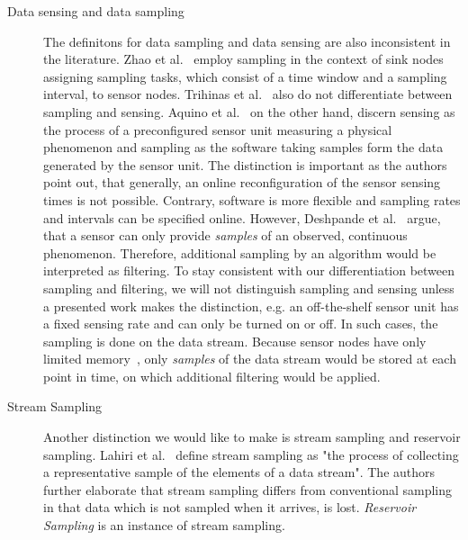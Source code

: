\begin{description}
    \item[Data sensing and data sampling] 
        The definitons for data sampling and data sensing are also inconsistent
        in the literature. Zhao et al.~\cite{zhao2016cats} employ sampling in
        the context of sink nodes assigning sampling tasks, which consist of a
        time window and a sampling interval, to sensor nodes. Trihinas et
        al.~\cite{trihinas2015adam} also do not differentiate between sampling
        and sensing.  Aquino et al.~\cite{aquino2014musa} on the other hand,
        discern sensing as the process of a preconfigured sensor unit measuring
        a physical phenomenon and sampling as the software taking samples form
        the data generated by the sensor unit. The distinction is important as
        the authors point out, that generally, an online reconfiguration of the
        sensor sensing times is not possible. Contrary, software is more
        flexible and sampling rates and intervals can be specified online.
        However, Deshpande et al.~\cite{deshpande2004model} argue, that a
        sensor can only provide \textit{samples} of an observed, continuous
        phenomenon. Therefore, additional sampling by an algorithm would be
        interpreted as filtering. To stay consistent with our differentiation
        between sampling and filtering, we will not distinguish sampling and
        sensing unless a presented work makes the distinction, e.g. an
        off-the-shelf sensor unit has a fixed sensing rate and can only be
        turned on or off. In such cases, the sampling is done on the data
        stream. Because sensor nodes have only limited
        memory~\cite{akyildiz2002wireless}, only \textit{samples} of the data
        stream would be stored at each point in time, on which additional
        filtering would be applied. 

    \item[Stream Sampling]
        Another distinction we would like to make is stream sampling and
        reservoir sampling. Lahiri et al.~\cite{Lahiri2009} define stream
        sampling as "the process of collecting a representative sample of the
        elements of a data stream". The authors further elaborate that stream
        sampling differs from conventional sampling in that data which is not
        sampled when it arrives, is lost. \textit{Reservoir Sampling} is an
        instance of stream sampling. 



\end{description}
